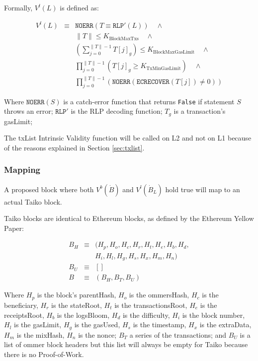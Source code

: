 \documentclass[9pt,oneside]{amsart}
\begin{document}
\begin{multicols}{2}
Formally, $V^l(L)$ is defined as:

\begin{eqnarray}
V^l(L) & \equiv & \texttt{NOERR}(T \equiv \texttt{RLP}'(L))  \quad \wedge  \\
\nonumber& & \lVert T \rVert \le K_{\mathrm{BlockMaxTxs}} \quad \wedge \\
\nonumber & & (\sum_{j = 0}^{\lVert T \rVert - 1}T[j]_g) \le K_{\mathrm{BlockMaxGasLimit}} \quad \wedge \\
\nonumber & & \prod_{j = 0}^{\lVert T \rVert - 1} (T[j]_g \ge K_{\mathrm{TxMinGasLimit}})\quad \wedge \\
\nonumber & & \prod_{j = 0}^{\lVert T \rVert - 1} (\texttt{NOERR}(\texttt{ECRECOVER}(T[j]) \ne 0) )
\end{eqnarray}

Where $\texttt{NOERR}(S)$ is a catch-error function that returns \texttt{False} if statement $S$ throws an error; $\texttt{RLP}'$ is the RLP decoding function;  $T_g$ is a transaction's gasLimit; 

The txList Intrinsic Validity function will be called on L2 and not on L1 because of the reasons explained in Section \ref{sec:txlist}.

\subsubsection{Mapping}

A proposed block where both $V^b(\dot{B})$ and $V^l(\dot{B}_L)$ hold true will map to an actual Taiko block.

Taiko blocks are identical to Ethereum blocks, as defined by the Ethereum Yellow Paper\cite{yellow-paper}:

\begin{eqnarray}
B_H & \equiv & (H_p, H_o, H_c, H_r, H_t, H_e, H_b, H_d, \\
\nonumber & & H_i, H_l,H_g, H_s, H_x, H_m, H_n) \\
B_U  & \equiv & [] \\
B & \equiv & (B_H, B_T, B_U)
\end{eqnarray}

Where $H_p$ is the block's parentHash, $H_o$ is the ommersHash, $H_c$ is the beneficiary, $H_r$ is the stateRoot, $H_t$ is the transactionsRoot, $H_e$ is the receiptsRoot, $H_b$ is the logsBloom, $H_d$ is the difficulty, $H_i$ is the block number, $H_l$ is the gasLimit, $H_g$ is the gasUsed, $H_s$ is the timestamp, $H_x$ is the extraData, $H_m$ is the mixHash, $H_n$ is the nonce; $B_T$ a series of the transactions; and $B_U$ is a list of ommer block headers but this list will always be empty for Taiko because there is no Proof-of-Work.


\end{multicols}
\end{document}
